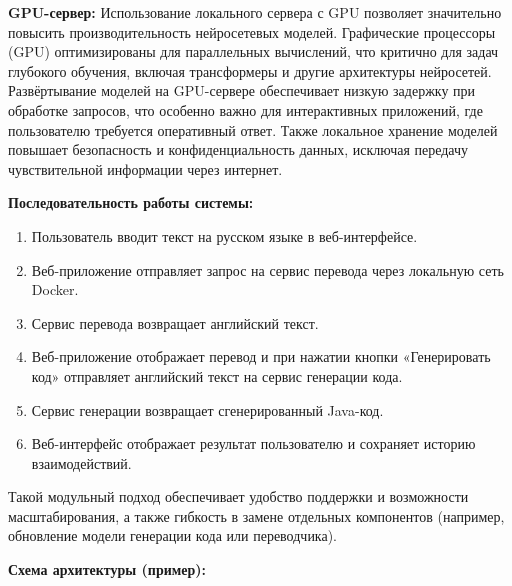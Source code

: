 \textbf{GPU-сервер:}  
Использование локального сервера с GPU позволяет значительно повысить производительность нейросетевых моделей. Графические процессоры (GPU) оптимизированы для параллельных вычислений, что критично для задач глубокого обучения, включая трансформеры и другие архитектуры нейросетей.  
Развёртывание моделей на GPU-сервере обеспечивает низкую задержку при обработке запросов, что особенно важно для интерактивных приложений, где пользователю требуется оперативный ответ. Также локальное хранение моделей повышает безопасность и конфиденциальность данных, исключая передачу чувствительной информации через интернет.

\bigskip

\textbf{Последовательность работы системы:}
\begin{enumerate}
    \item Пользователь вводит текст на русском языке в веб-интерфейсе.
    \item Веб-приложение отправляет запрос на сервис перевода через локальную сеть Docker.
    \item Сервис перевода возвращает английский текст.
    \item Веб-приложение отображает перевод и при нажатии кнопки «Генерировать код» отправляет английский текст на сервис генерации кода.
    \item Сервис генерации возвращает сгенерированный Java-код.
    \item Веб-интерфейс отображает результат пользователю и сохраняет историю взаимодействий.
\end{enumerate}

Такой модульный подход обеспечивает удобство поддержки и возможности масштабирования, а также гибкость в замене отдельных компонентов (например, обновление модели генерации кода или переводчика).

\bigskip

\textbf{Схема архитектуры (пример):}

